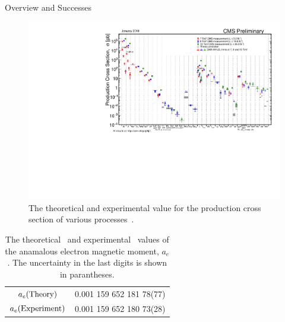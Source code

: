 \begin{section}{Overview and Successes}
\begin{figure}[tbp!]
\begin{center}
\includegraphics[angle=0,width=0.95\columnwidth]{fig/sm_tests.pdf}
\end{center}
\caption{The theoretical and experimental value for the production cross section of various processes~\cite{sm_tests}.}
\label{fig:sm_tests}
\end{figure}

\begin{table}[tbp!]
\centering
\begin{tabular}{ |c|c| }
\hline
$a_e \mathrm{(Theory)}$      &  0.001 159 652 181 78(77) \\
$a_e \mathrm{(Experiment)}$  &  0.001 159 652 180 73(28) \\
\hline
\end{tabular}
\caption{The theoretical~\cite{PhysRevLett.109.111807} and experimental~\cite{PhysRevLett.100.120801,PhysRevA.83.052122} values of the anamalous electron magnetic moment, $a_e$.
The uncertainty in the last digits is shown in parantheses.}
\label{tab:ae_values}
\end{table}

\end{section}

